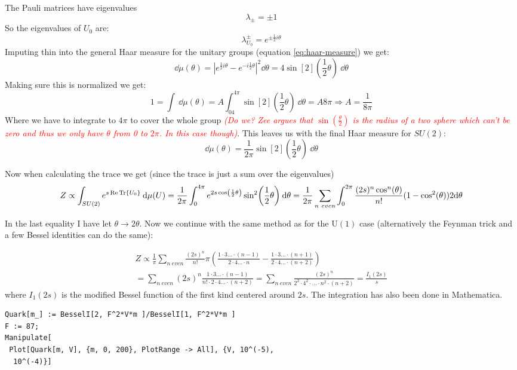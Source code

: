 \documentclass[a4,10pt,titlepage]{article}
\renewcommand\[{\begin{equation*}}
\renewcommand\]{\end{equation*}}
\newcommand{\be}{\begin{equation}}
\newcommand{\ee}{\end{equation}}
\numberwithin{equation}{section}
\newcommand{\lp}{\left}
\newcommand{\rp}{\right}
\newcommand{\edit}[1]{\textcolor{red}{\textit{#1}}}
\newcommand{\half}{\frac{1}{2}}
\begin{document}
The Pauli matrices have eigenvalues  
\[
\lambda_{\pm}=\pm 1
\]
So the eigenvalues of $U_0$ are:
\[
\lambda_{U_0}^\pm=e^{\pm\frac{1}{2}i\theta}
\]
Imputing thin into the general Haar measure for the unitary groups (equation \ref{eq:haar-measure}) we get:
\[
\dd\mu(\theta)=\lp|e^{\half i\theta}-e^{-i\half\theta}\rp|^2\dd \theta=4\sin[2](\half\theta)\:\dd\theta
\]
Making sure this is normalized we get:
\[
1=\int\:\dd\mu(\theta)=A\int^{4\pi}_04\sin[2](\half\theta)\:\dd\theta=A 8\pi\Rightarrow A=\frac{1}{8\pi}
\]
Where we have to integrate to $4\pi$ to cover the whole group \edit{(Do we? Zee argues that $\sin(\frac{\theta}{2})$ is the radius of a two sphere which can't be zero and thus we only have $\theta$ from 0 to $2\pi$. In this case though)}. This leaves us with the final Haar measure for $SU(2)$:
\be
\dd\mu(\theta)=\frac{1}{2\pi}\sin[2](\half\theta)\:\dd\theta
\ee

Now when calculating the trace we get (since the trace is just a sum over the eigenvalues)
\[
Z\propto \int_{SU(2)}e^{s\Re\Tr{U_0}}\:\dd\mu(U)=\frac{1}{2\pi}\int_{0}^{4\pi}e^{2s\cos(\half\theta)}\sin[2](\half\theta)\:\dd \theta=\frac{1}{2\pi} \sum_{n\ even} \int_{0}^{2\pi} \frac{(2s)^n\cos^n(\theta)}{n!}(1-\cos^2(\theta))2\dd\theta
\]

In the last equality I have let $\theta \rightarrow 2\theta$. Now we continue with the same method as for the U$(1)$ case (alternatively the Feynman trick and a few Bessel identities can do the same):

\begin{equation}
\begin{split}
Z\propto \frac{1}{\pi} \sum_{n\ even} \frac{(2s)^n}{n!}\pi \lp(  \frac{1\cdot3 \ldots \cdot (n-1)}{2\cdot4\ldots\cdot n} - \frac{1\cdot3 \ldots \cdot (n+1)}{2\cdot4\ldots\cdot (n+2)}\rp) \\= \sum_{n\ even}(2s)^n \frac{1\cdot3 \ldots \cdot (n-1)}{n!\cdot2\cdot4\ldots\cdot (n+2)} =\sum_{n\ even}\frac{(2s)^n}{2^2\cdot4^2\cdot\ldots\cdot n^2\cdot(n+2)}=\frac{I_1(2s)}{s}
\end{split}
\end{equation}
where $I_1(2s)$ is the modified Bessel function of the first kind centered around $2s$. The integration has also been done in Mathematica.

\begin{lstlisting}
Quark[m_] := BesselI[2, F^2*V*m ]/BesselI[1, F^2*V*m ]
F := 87;
Manipulate[
 Plot[Quark[m, V], {m, 0, 200}, PlotRange -> All], {V, 10^(-5), 
  10^(-4)}]
\end{lstlisting}
\end{document}
